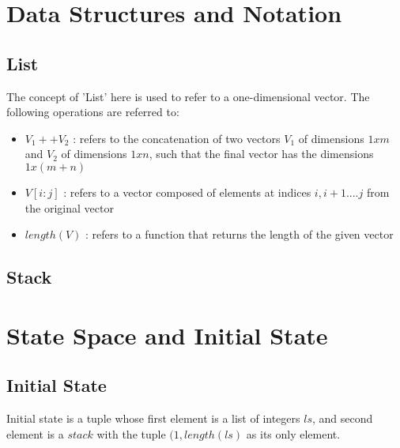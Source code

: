 \documentclass[12pt]{article}
\begin{document}
 

\rhead{\today}
 

\section{Data Structures and Notation}

\subsection{List}

The concept of 'List' here is used to refer to a one-dimensional vector. The following operations are referred to:

\begin{itemize}
\item []
$V_1 ++ V_2$ : refers to the concatenation of two vectors $V_1$ of dimensions $1 x m$ and $V_2$ of dimensions $1 x n$, such that the final vector has the dimensions $1 x (m + n)$
\item []
$V [ i : j ]$ : refers to a vector composed of elements at indices $i, i+1....j$ from the original vector
\item []
$length(V)$ : refers to a function that returns the length of the given vector
\end{itemize}

\subsection{Stack}

\section{State Space and Initial State}

\subsection{Initial State}

Initial state is a tuple whose first element is a list of integers $ls$, and second element is a $stack$ with the tuple $(1, length(ls)$ as its only element.
\end{document}
